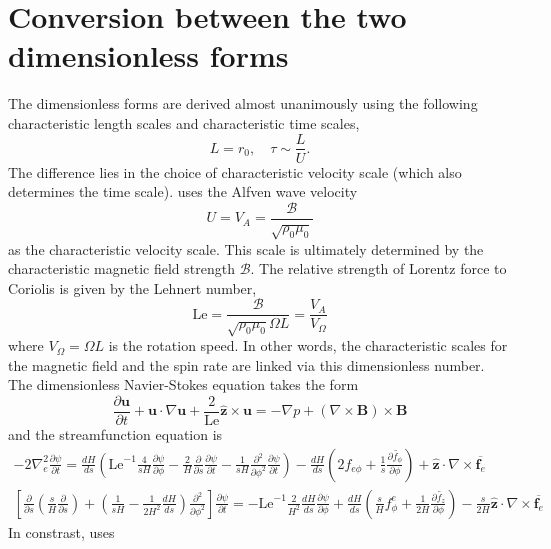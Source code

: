 \section{Conversion between the two dimensionless forms}

The dimensionless forms are derived almost unanimously using the following characteristic length scales and characteristic time scales,
\[L = r_0,\quad \tau \sim \frac{L}{U}.\]
The difference lies in the choice of characteristic velocity scale (which also determines the time scale).
\textcite{holdenried-chernoff_long_2021} uses the Alfven wave velocity
\[U = V_A = \frac{\mathscr{B}}{\sqrt{\rho_0 \mu_0}}\]
as the characteristic velocity scale. This scale is ultimately determined by the characteristic magnetic field strength $\mathscr{B}$. The relative strength of Lorentz force to Coriolis is given by the Lehnert number,
\[\mathrm{Le} = \frac{\mathscr{B}}{\sqrt{\rho_0 \mu_0}\Omega L} = \frac{V_A}{V_\Omega}\]
where $V_\Omega = \Omega L$ is the rotation speed. In other words, the characteristic scales for the magnetic field and the spin rate are linked via this dimensionless number. The dimensionless Navier-Stokes equation takes the form
\[
    \frac{\partial \mathbf{u}}{\partial t} + \mathbf{u}\cdot \nabla \mathbf{u} + \frac{2}{\mathrm{Le}}\hat{\mathbf{z}}\times \mathbf{u} = -\nabla p + (\nabla\times\mathbf{B})\times \mathbf{B}
\]
and the streamfunction equation is
\[\begin{gathered}
    -2\nabla_e^2 \frac{\partial \psi}{\partial t} = \frac{dH}{ds} \left(\mathrm{Le}^{-1}\frac{4}{sH}\frac{\partial \psi}{\partial \phi} - \frac{2}{H}\frac{\partial}{\partial s}\frac{\partial \psi}{\partial t} - \frac{1}{sH}\frac{\partial^2}{\partial \phi^2}\frac{\partial \psi}{\partial t}\right) - \frac{dH}{ds}\left(2f_{e\phi} + \frac{1}{s}\frac{\partial \widetilde{f_\phi}}{\partial \phi}\right) + \hat{\mathbf{z}}\cdot \nabla\times \overline{\mathbf{f}_e} \\ 
    \left[\frac{\partial}{\partial s}\left(\frac{s}{H}\frac{\partial}{\partial s}\right) + \left(\frac{1}{sH} - \frac{1}{2H^2} \frac{dH}{ds}\right)\frac{\partial^2}{\partial \phi^2}\right] \frac{\partial \psi}{\partial t} = - \mathrm{Le}^{-1}\frac{2}{H^2}\frac{dH}{ds} \frac{\partial \psi}{\partial \phi} + \frac{dH}{ds} \left(\frac{s}{H} f_\phi^e + \frac{1}{2H}\frac{\partial \widetilde{f_z}}{\partial \phi}\right) - \frac{s}{2H}\hat{\mathbf{z}}\cdot \nabla\times \overline{\mathbf{f}_e}
\end{gathered}
\]
In constrast, \textcite{jackson_plesio-geostrophy_2020} uses 
